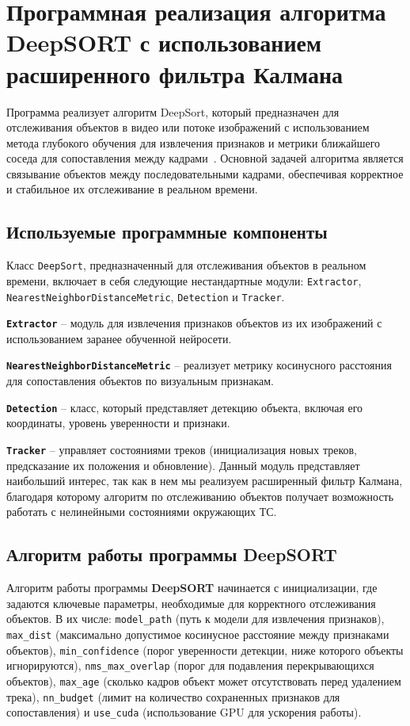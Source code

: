 \section{Программная реализация алгоритма DeepSORT с использованием расширенного фильтра Калмана}

Программа реализует алгоритм DeepSort, который предназначен для отслеживания объектов в видео или потоке изображений с использованием метода глубокого обучения для извлечения признаков и метрики ближайшего соседа для сопоставления между кадрами~\cite{sun2006onroad}. Основной задачей алгоритма является связывание объектов между последовательными кадрами, обеспечивая корректное и стабильное их отслеживание в реальном времени.

\subsection{Используемые программные компоненты}

Класс \lstinline:DeepSort:, предназначенный для отслеживания объектов в реальном времени, включает в себя следующие нестандартные модули:  \lstinline:Extractor:, \lstinline:NearestNeighborDistanceMetric:, \lstinline:Detection: и \lstinline:Tracker:. 

\textbf{\lstinline:Extractor:} -- модуль для извлечения признаков объектов из их изображений с использованием заранее обученной нейросети.

\textbf{\lstinline:NearestNeighborDistanceMetric:} -- реализует метрику косинусного расстояния для сопоставления объектов по визуальным признакам.

\textbf{\lstinline:Detection:} --  класс, который представляет детекцию объекта, включая его координаты, уровень уверенности и признаки.

\textbf{\lstinline:Tracker:} -- управляет состояниями треков (инициализация новых треков, предсказание их положения и обновление). Данный модуль представляет наибольший интерес, так как в нем мы реализуем расширенный фильтр Калмана, благодаря которому алгоритм по отслеживанию объектов получает возможность работать с нелинейными состояниями окружающих ТС.

\subsection{Алгоритм работы программы DeepSORT}

Алгоритм работы программы \textbf{DeepSORT} начинается с инициализации, где задаются ключевые параметры, необходимые для корректного отслеживания объектов. В их числе: \lstinline:model_path: (путь к модели для извлечения признаков), \lstinline:max_dist: (максимально допустимое косинусное расстояние между признаками объектов), \lstinline:min_confidence: (порог уверенности детекции, ниже которого объекты игнорируются), \lstinline:nms_max_overlap: (порог для подавления перекрывающихся объектов), \lstinline:max_age: (сколько кадров объект может отсутствовать перед удалением трека), \lstinline:nn_budget: (лимит на количество сохраненных признаков для сопоставления) и \lstinline:use_cuda: (использование GPU для ускорения работы).

